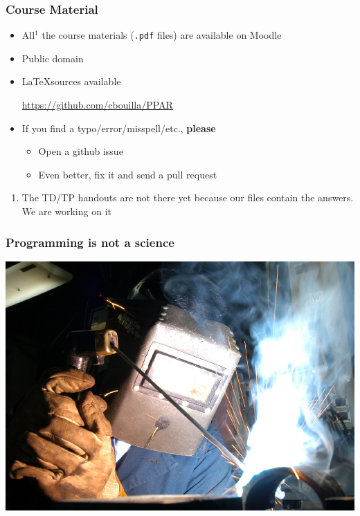 \documentclass[10pt]{beamer}
\begin{document}
\begin{frame}
  \frametitle{Course Material}

  \begin{itemize}
  \item All${}^1$ the course materials (\texttt{.pdf} files) are available on Moodle
  \item Public domain
  \item \LaTeX sources available
    \begin{center}
      \url{https://github.com/cbouilla/PPAR}
    \end{center}

    \medskip

  \item If you find a typo/error/misspell/etc., \textbf{please}
    \begin{itemize}
    \item Open a github issue
    \item Even better, fix it and send a pull request
    \end{itemize}
  \end{itemize}

  \vfill

  \tiny
  \begin{enumerate}
  \item The TD/TP handouts are not there yet because our files contain the answers. We are working on it
  \end{enumerate}
\end{frame}


\begin{frame}
  \frametitle{Programming is \textbf{not} a science}

  \centering
  \includegraphics[width=\textwidth]{welding.jpg}
\end{frame}
\end{document}
